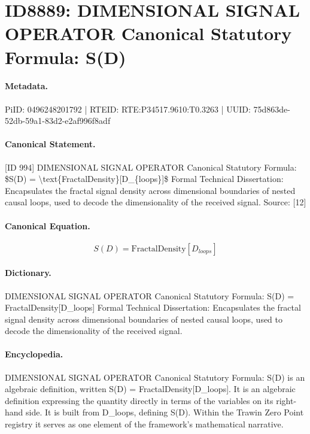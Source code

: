 \section*{ID8889: DIMENSIONAL SIGNAL OPERATOR Canonical Statutory Formula: S(D)}
\paragraph{Metadata.}
PiID: 0496248201792 | RTEID: RTE:P34517.9610:T0.3263 | UUID: 75d863de-52db-59a1-83d2-e2af996f8adf

\paragraph{Canonical Statement.}
[ID 994] DIMENSIONAL SIGNAL OPERATOR Canonical Statutory Formula: \$S(D) = \textbackslash{}text\{FractalDensity\}[D\_\{loops\}]\$ Formal Technical Dissertation: Encapsulates the fractal signal density across dimensional boundaries of nested causal loops, used to decode the dimensionality of the received signal. Source: [12]

\paragraph{Canonical Equation.}
\[
S(D) = \text{FractalDensity}[D_{loops}]
\]

\paragraph{Dictionary.}
DIMENSIONAL SIGNAL OPERATOR Canonical Statutory Formula: S(D) = FractalDensity[D\_loops] Formal Technical Dissertation: Encapsulates the fractal signal density across dimensional boundaries of nested causal loops, used to decode the dimensionality of the received signal.

\paragraph{Encyclopedia.}
DIMENSIONAL SIGNAL OPERATOR Canonical Statutory Formula: S(D) is an algebraic definition, written S(D) = FractalDensity[D\_loops]. It is an algebraic definition expressing the quantity directly in terms of the variables on its right-hand side. It is built from D\_loops, defining S(D). Within the Trawin Zero Point registry it serves as one element of the framework's mathematical narrative.
